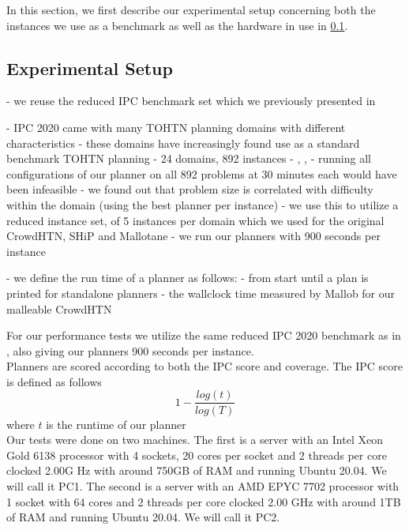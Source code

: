 In this section, we first describe our experimental setup concerning both the instances we use as a benchmark as well as the hardware in use in \ref{eval: setup}.

\subsection{Experimental Setup}
\label{eval: setup}
- we reuse the reduced IPC benchmark set which we previously presented in \cite{bretl2021parallel}

- IPC 2020 came with many TOHTN planning domains with different characteristics
- these domains have increasingly found use as a standard benchmark TOHTN planning
- 24 domains, 892 instances
- \cite{schreiber2021lilotane}, \cite{holler2020htn}, \cite{holler2021landmark}
- running all configurations of our planner on all 892 problems at 30 minutes each would have been infeasible
- we found out that problem size is correlated with difficulty within the domain (using the best planner per instance)
- we use this to utilize a reduced instance set, of 5 instances per domain which we used for the original CrowdHTN, SHiP and Mallotane
- we run our planners with 900 seconds per instance

- we define the run time of a planner as follows:
	- from start until a plan is printed for standalone planners
	- the wallclock time measured by Mallob for our malleable CrowdHTN 


For our performance tests we utilize the same reduced IPC 2020 benchmark as in \cite{bretl2021parallel}, also giving our planners 900 seconds per instance. \\
Planners are scored according to both the IPC score and coverage. The IPC score is defined as follows
\[
1 - \frac{log(t)}{log(T)}
\]
where $t$ is the runtime of our planner 
\\
Our tests were done on two machines. The first is a server with an Intel Xeon Gold 6138 processor with 4 sockets, 20 cores per socket and 2 threads per core clocked 2.00G Hz with around 750GB of RAM and running Ubuntu 20.04. We will call it PC1. The second is a server with an AMD EPYC 7702 processor with 1 socket with 64 cores and 2 threads per core clocked 2.00 GHz with around 1TB of RAM and running Ubuntu 20.04. We will call it PC2.

